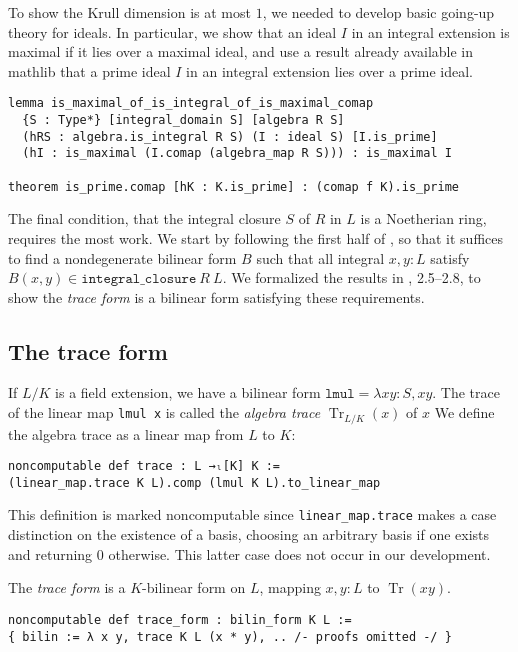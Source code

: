 \documentclass[a4paper,USenglish,cleveref, autoref, thm-restate]{lipics-v2021}
\newcommand{\lean}[1]{\texttt{#1}\xspace} %
\DeclareMathOperator{\Tr}{\mathrm{Tr}}
\newcommand{\mathlib}{\textsf{mathlib}\xspace}
\begin{document}
To show the Krull dimension is at most $1$, we needed to develop basic going-up theory for ideals.
In particular, we show that an ideal $I$ in an integral extension is maximal if it lies over a maximal ideal,
and use a result already available in \mathlib that a prime ideal $I$ in an integral extension lies over a prime ideal.
\begin{lstlisting}
lemma is_maximal_of_is_integral_of_is_maximal_comap
  {S : Type*} [integral_domain S] [algebra R S]
  (hRS : algebra.is_integral R S) (I : ideal S) [I.is_prime]
  (hI : is_maximal (I.comap (algebra_map R S))) : is_maximal I

theorem is_prime.comap [hK : K.is_prime] : (comap f K).is_prime
\end{lstlisting}

The final condition, that the integral closure $S$ of $R$ in $L$ is a Noetherian ring, requires the most work.
We start by following the first half of \cite[Theorem 15.29]{Dummit-and-Foote},
so that it suffices to find a nondegenerate bilinear form $B$ such that all integral $x, y : L$ satisfy $B(x, y) \in \lean{integral\_closure}\ R\ L$.
We formalized the results in \cite{Neukirch}, 2.5--2.8, to show the \emph{trace form} is a bilinear form satisfying these requirements.

\subsection{The trace form}\label{sec:trace-form}
If $L / K$ is a field extension, we have a bilinear form $\lean{lmul} = \lambda x y : S, xy$.
The trace of the linear map \lean{lmul x} is called the \emph{algebra trace} $\Tr_{L / K}(x)$ of $x$
We define the algebra trace as a linear map from $L$ to $K$:
\begin{lstlisting}
noncomputable def trace : L →ₗ[K] K :=
(linear_map.trace K L).comp (lmul K L).to_linear_map
\end{lstlisting}
This definition is marked noncomputable since \lean{linear\_map.trace} makes a case distinction on the existence of a basis,
choosing an arbitrary basis if one exists and returning $0$ otherwise.
This latter case does not occur in our development.

The \emph{trace form} is a $K$-bilinear form on $L$, mapping $x, y : L$ to $\Tr(xy)$.
\begin{lstlisting}
noncomputable def trace_form : bilin_form K L :=
{ bilin := λ x y, trace K L (x * y), .. /- proofs omitted -/ }
\end{lstlisting}
\end{document}
